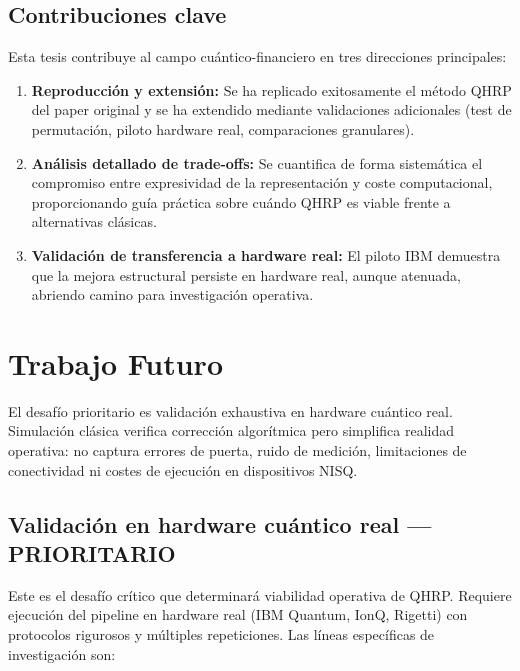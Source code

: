 \subsection{Contribuciones clave}

Esta tesis contribuye al campo cuántico-financiero en tres direcciones principales:

\begin{enumerate}
	\item \textbf{Reproducción y extensión:} Se ha replicado exitosamente el método QHRP del paper original y se ha extendido mediante validaciones adicionales (test de permutación, piloto hardware real, comparaciones granulares).
	\item \textbf{Análisis detallado de trade-offs:} Se cuantifica de forma sistemática el compromiso entre expresividad de la representación y coste computacional, proporcionando guía práctica sobre cuándo QHRP es viable frente a alternativas clásicas.
	\item \textbf{Validación de transferencia a hardware real:} El piloto IBM demuestra que la mejora estructural persiste en hardware real, aunque atenuada, abriendo camino para investigación operativa.
\end{enumerate}

\section{Trabajo Futuro}
\label{sec:trabajo_futuro}

El desafío prioritario es validación exhaustiva en hardware cuántico real. Simulación clásica verifica corrección algorítmica pero simplifica realidad operativa: no captura errores de puerta, ruido de medición, limitaciones de conectividad ni costes de ejecución en dispositivos NISQ.

\subsection{Validación en hardware cuántico real — PRIORITARIO}
Este es el desafío crítico que determinará viabilidad operativa de QHRP. Requiere ejecución del pipeline en hardware real (IBM Quantum, IonQ, Rigetti) con protocolos rigurosos y múltiples repeticiones. Las líneas específicas de investigación son:

